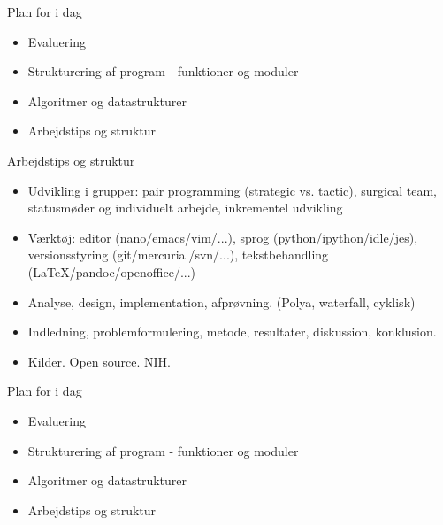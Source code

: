 \documentclass[a4paper,landscape]{slides}
\begin{document}
\begin{slide}
	\begin{center} {\large 
            Plan for i dag
	} \end{center}
	\begin{itemize} \addtolength{\itemsep}{-\baselineskip}
            \item Evaluering
            \item Strukturering af program - funktioner og moduler
            \item Algoritmer og datastrukturer
            \item Arbejdstips og struktur
	\end{itemize}
\end{slide}


\begin{slide}
	\begin{center} {\large 
           Arbejdstips og struktur
	} \end{center}
	\begin{itemize} \addtolength{\itemsep}{-\baselineskip}
                \item Udvikling i grupper: pair programming (strategic vs. tactic), surgical team, statusmøder og individuelt arbejde, inkrementel udvikling
                \item Værktøj: editor (nano/emacs/vim/...), sprog (python/ipython/idle/jes), versionsstyring (git/mercurial/svn/...), tekstbehandling (\LaTeX{}/pandoc/openoffice/...)
                \item Analyse, design, implementation, afprøvning. (Polya, waterfall, cyklisk)
                \item Indledning, problemformulering, metode, resultater, diskussion, konklusion. 
                \item Kilder. Open source. NIH.
	\end{itemize}
\end{slide}

\begin{slide}
	\begin{center} {\large 
            Plan for i dag
	} \end{center}
	\begin{itemize} \addtolength{\itemsep}{-\baselineskip}
            \item Evaluering
            \item Strukturering af program - funktioner og moduler
            \item Algoritmer og datastrukturer
            \item Arbejdstips og struktur
	\end{itemize}
\end{slide}
\end{document}
